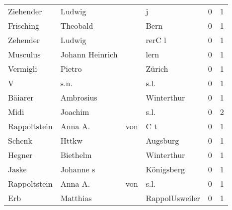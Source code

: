 \begin{center}
\begin{tiny}
\begin{longtabu}{llllrr}
                Ziehender &                             Ludwig &             &                                           j &          0 &         1 \\
                Frisching &                           Theobald &             &                                        Bern &          0 &         1 \\
                 Zehender &                             Ludwig &             &                                      rerC l &          0 &         1 \\
                 Musculus &                    Johann Heinrich &             &                                        lern &          0 &         1 \\
                 Vermigli &                             Pietro &             &                                      Zürich &          0 &         1 \\
                        V &                               s.n. &             &                                        s.l. &          0 &         1 \\
                  Bäiarer &                          Ambrosius &             &                                  Winterthur &          0 &         1 \\
                     Midi &                            Joachim &             &                                        s.l. &          0 &         2 \\
             Rappoltstein &                            Anna A. &         von &                                         C t &          0 &         1 \\
                   Schenk &                              Httkw &             &                                    Augsburg &          0 &         1 \\
                   Hegner &                           Biethelm &             &                                  Winterthur &          0 &         1 \\
                    Jaske &                          Johanne s &             &                                  Königsberg &          0 &         1 \\
             Rappoltstein &                            Anna A. &         von &                                        s.l. &          0 &         1 \\
                      Erb &                           Matthias &             &                              RappolUsweiler &          0 &         1 \\

\end{longtabu}
\end{tiny}
\end{center}
